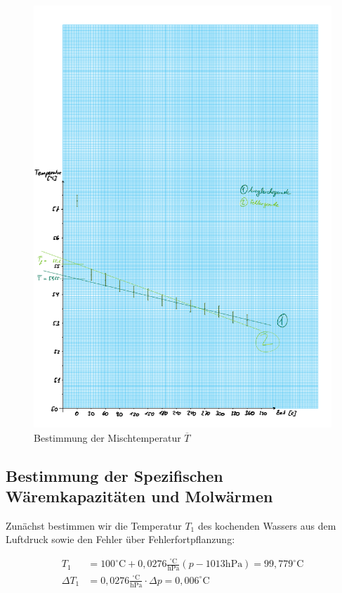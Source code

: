 \documentclass{article}
\begin{document}
\begin{figure} [p]
    \centering
    \includegraphics[width=\textwidth]{graphics/dia11.pdf}
    \caption{Bestimmung der Mischtemperatur $\overline{T}$}
\end{figure}


\newpage

\subsection{Bestimmung der Spezifischen Wäremkapazitäten und Molwärmen}

Zunächst bestimmen wir die Temperatur $T_1$ des kochenden Wassers aus dem Luftdruck sowie den Fehler über Fehlerfortpflanzung:

\begin{equation}
    \begin{split}
        T_1 &= 100^{\circ} \text{C} + 0,0276 \frac{^{\circ} \text{C}}{\text{hPa}} (p-1013 \text{hPa}) = 99,779^{\circ} \text{C} \\
        \Delta T_1 &= 0,0276 \frac{^{\circ} \text{C}}{\text{hPa}} \cdot \Delta p = 0,006^{\circ} \text{C}
    \end{split}
\end{equation}
\end{document}
